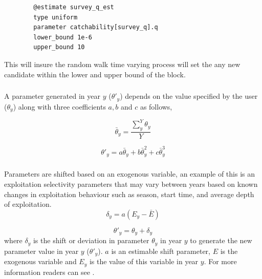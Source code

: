 {\small{\begin{verbatim}
		@estimate survey_q_est
		type uniform
		parameter catchability[survey_q].q
		lower_bound 1e-6
		upper_bound 10
		\end{verbatim}}}
This will insure the random walk time varying process will set the any new candidate within the lower and upper bound of the  block.

\subsubsection[Annual shift]{}
A parameter generated in year $y$ ($\theta'_y$) depends on the value specified by the user ($\theta_y$) along with three coefficients $a,b$ and $c$ as follows,

\begin{equation}
\bar{\theta}_y = \frac{\sum_{y}^Y\theta_y}{Y}
\end{equation}

\begin{equation}
\theta'_y = a \bar{\theta}_y + b\bar{\theta}_y^{2} + c\bar{\theta}_y^{3}
\end{equation}

\subsubsection[Exogenous]{}

Parameters are shifted based on an exogenous variable, an example of this is an exploitation selectivity parameters that may vary between years based on known changes in exploitation behaviour such as season, start time, and average depth of exploitation.
\begin{equation}
\delta_y = a(E_y - \bar{E})
\end{equation}

\begin{equation}
\theta'_y = \theta_y + \delta_y
\end{equation}
where $\delta_y$ is the shift or deviation in parameter $\theta_y$ in year $y$ to generate the new parameter value in year $y$ ($\theta'_y$). $a$ is an estimable shift parameter, $E$ is the exogenous variable and $E_y$ is the value of this variable in year $y$. For more information readers can see \cite{francis_03}.

